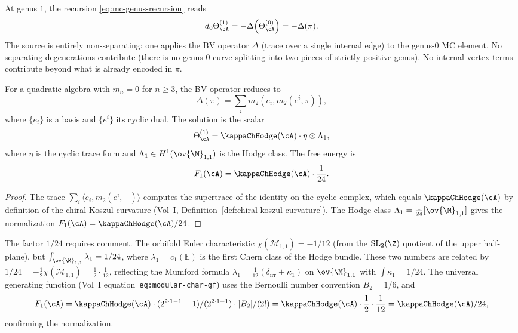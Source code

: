 \begin{computation}
At genus $1$, the recursion \eqref{eq:mc-genus-recursion} reads
\[
d_0 \Theta_\cA^{(1)}
= -\Delta\!\left(\Theta_\cA^{(0)}\right)
= -\Delta(\pi).
\]
The source is entirely non-separating: one applies the BV operator $\Delta$
(trace over a single internal edge) to the genus-$0$ MC element. No
separating degenerations contribute (there is no genus-$0$ curve splitting
into two pieces of strictly positive genus). No internal vertex terms
contribute beyond what is already encoded in $\pi$.

For a quadratic algebra with $m_n = 0$ for $n \geq 3$, the BV operator reduces to
\[
\Delta(\pi) = \sum_{i} m_2(e_i, m_2(e^i, \pi)),
\]
where $\{e_i\}$ is a basis and $\{e^i\}$ its cyclic dual. The solution is the
scalar
\begin{equation}
\Theta_\cA^{(1)} = \kappaChHodge(\cA) \cdot \eta \otimes \Lambda_1,
\end{equation}
where $\eta$ is the cyclic trace form and $\Lambda_1 \in H^1(\ov{\M}_{1,1})$ is
the Hodge class. The free energy is
\begin{equation}
F_1(\cA) = \kappaChHodge(\cA) \cdot \frac{1}{24}.
\end{equation}
\end{computation}

\begin{proof}
The trace $\sum_i \langle e_i, m_2(e^i, -) \rangle$ computes the supertrace
of the identity on the cyclic complex, which equals $\kappaChHodge(\cA)$ by definition
of the chiral Koszul curvature (Vol~I, Definition~\ref*{def:chiral-koszul-curvature}).
The Hodge class $\Lambda_1 = \frac{1}{24}[\ov{\M}_{1,1}]$ gives the
normalization \(F_1(\cA)=\kappaChHodge(\cA)/24\).
\end{proof}

\begin{remark}
The factor $1/24$ requires comment. The orbifold Euler characteristic
$\chi(\mathcal{M}_{1,1}) = -1/12$ (from the $\mathrm{SL}_2(\Z)$ quotient
of the upper half-plane), but $\int_{\ov{\M}_{1,1}} \lambda_1 = 1/24$, where
$\lambda_1 = c_1(\mathbb{E})$ is the first Chern class of the Hodge bundle.
These two numbers are related by $1/24 = -\frac{1}{2}\chi(\mathcal{M}_{1,1})
= \frac{1}{2} \cdot \frac{1}{12}$, reflecting the Mumford formula
$\lambda_1 = \frac{1}{12}(\delta_{\mathrm{irr}} + \kappa_1)$ on
$\ov{\M}_{1,1}$ with $\int \kappa_1 = 1/24$. The universal generating
function (Vol~I equation~\texttt{eq:modular-char-gf}) uses the Bernoulli
number convention $B_2 = 1/6$, and
\[
F_1(\cA)=\kappaChHodge(\cA)\cdot
(2^{2\cdot 1 - 1} - 1)/(2^{2\cdot 1 - 1}) \cdot |B_2|/(2!) =
\kappaChHodge(\cA) \cdot \frac{1}{2} \cdot \frac{1}{12}
=\kappaChHodge(\cA)/24,
\]
confirming the
normalization.
\end{remark}

